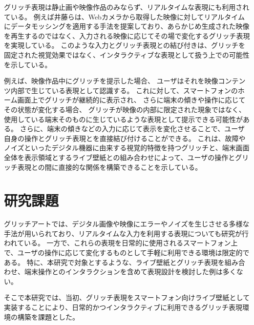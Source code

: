グリッチ表現は静止画や映像作品のみならず、リアルタイムな表現にも利用されている。
例えば井藤らは、Webカメラから取得した映像に対してリアルタイムにデータモッシングを適用する手法を提案しており、あらかじめ生成された映像を再生するのではなく、入力される映像に応じてその場で変化するグリッチ表現を実現している\cite{ito2013datamoshing}。
このような入力とグリッチ表現との結び付きは、グリッチを固定された視覚効果ではなく、インタラクティブな表現として扱う上での可能性
を示している。


例えば、映像作品中にグリッチを提示した場合、
ユーザはそれを映像コンテンツ内部で生じている表現として認識する。
これに対して、スマートフォンのホーム画面上でグリッチが継続的に表示され、
さらに端末の傾きや操作に応じてその状態が変化する場合、
グリッチが映像の内部に限定された現象ではなく、使用している端末そのものに生じているような表現として提示できる可能性がある。
さらに、端末の傾きなどの入力に応じて表示を変化させることで、ユーザ自身の操作とグリッチ表現とを直接結び付けることができる。
これは、故障やノイズといったデジタル機器に由来する視覚的特徴を持つグリッチと、端末画面全体を表示領域とするライブ壁紙との組み合わせによって、ユーザの操作とグリッチ表現との間に直接的な関係を構築できることを示している。





\section{研究課題}

グリッチアートでは、デジタル画像や映像にエラーやノイズを生じさせる多様な手法が用いられており、リアルタイムな入力を利用する表現についても研究が行われている。
一方で、これらの表現を日常的に使用されるスマートフォン上で、ユーザの操作に応じて変化するものとして手軽に利用できる環境は限定的である。
特に、本研究で対象とするような、ライブ壁紙とグリッチ表現を組み合わせ、端末操作とのインタラクションを含めて表現設計を検討した例は多くない。

そこで本研究では、当初、グリッチ表現をスマートフォン向けライブ壁紙として実装することにより、日常的かつインタラクティブに利用できるグリッチ表現環境の構築を課題とした。

